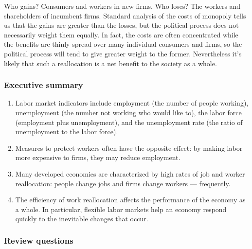 \documentclass[letterpaper,12pt]{article}
\begin{document}
Who gains? Consumers and workers in new firms. Who loses?
The workers and shareholders of incumbent firms.  
Standard analysis of the costs of monopoly tells us 
that the gains are greater than the losses, 
but the political process does not necessarily weight them
equally.  In fact, the costs are often concentrated while the benefits are thinly spread over many individual consumers and firms, 
so the political process will tend to give greater weight to the former. 
Nevertheless it's likely that such a reallocation
is a net benefit to the society as a whole.   


\subsubsection*{Executive summary}

\begin{enumerate}
\item Labor market indicators include employment (the number of
people working), unemployment (the number not working who would
like to), the labor force (employment plus unemployment), and the
unemployment rate (the ratio of unemployment to the labor force).  

\item Measures to protect workers often have the opposite effect:  
by making labor more expensive to firms, they may reduce employment.  

\item Many developed economies are characterized by high rates of job
and worker reallocation: people change jobs and firms change
workers --- frequently.  

\item The efficiency of work reallocation affects the performance
of the economy as a whole. In particular, flexible labor markets help an economy respond quickly to the inevitable changes that occur.  


\end{enumerate}

\subsubsection*{Review questions}
\end{document}
